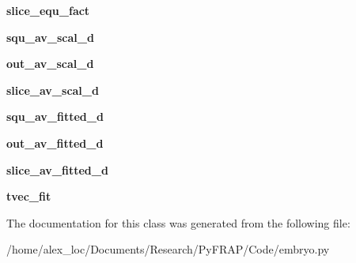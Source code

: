 \begin{DoxyCompactItemize}
\item 
\hypertarget{classembryo_1_1fit_a37bb6ea29d982d8238b3c079fff11ba7}{{\bfseries slice\+\_\+equ\+\_\+fact}}\label{classembryo_1_1fit_a37bb6ea29d982d8238b3c079fff11ba7}

\item 
\hypertarget{classembryo_1_1fit_a14d10ad90d5fa0be505dc6ad014aa457}{{\bfseries squ\+\_\+av\+\_\+scal\+\_\+d}}\label{classembryo_1_1fit_a14d10ad90d5fa0be505dc6ad014aa457}

\item 
\hypertarget{classembryo_1_1fit_aabd69eae141a7d325bd76324ddce732f}{{\bfseries out\+\_\+av\+\_\+scal\+\_\+d}}\label{classembryo_1_1fit_aabd69eae141a7d325bd76324ddce732f}

\item 
\hypertarget{classembryo_1_1fit_adea19a558ac1a2cf222bfbc5386c9556}{{\bfseries slice\+\_\+av\+\_\+scal\+\_\+d}}\label{classembryo_1_1fit_adea19a558ac1a2cf222bfbc5386c9556}

\item 
\hypertarget{classembryo_1_1fit_a2288c0102f953546d859d4595712d549}{{\bfseries squ\+\_\+av\+\_\+fitted\+\_\+d}}\label{classembryo_1_1fit_a2288c0102f953546d859d4595712d549}

\item 
\hypertarget{classembryo_1_1fit_a689a6b4e36fd70bc202439d37926b028}{{\bfseries out\+\_\+av\+\_\+fitted\+\_\+d}}\label{classembryo_1_1fit_a689a6b4e36fd70bc202439d37926b028}

\item 
\hypertarget{classembryo_1_1fit_a2de644070aae306a8308071110fb0606}{{\bfseries slice\+\_\+av\+\_\+fitted\+\_\+d}}\label{classembryo_1_1fit_a2de644070aae306a8308071110fb0606}

\item 
\hypertarget{classembryo_1_1fit_ab94efbfe1f3d537e69209af79aff36c6}{{\bfseries tvec\+\_\+fit}}\label{classembryo_1_1fit_ab94efbfe1f3d537e69209af79aff36c6}

\end{DoxyCompactItemize}


The documentation for this class was generated from the following file\+:\begin{DoxyCompactItemize}
\item 
/home/alex\+\_\+loc/\+Documents/\+Research/\+Py\+F\+R\+A\+P/\+Code/embryo.\+py\end{DoxyCompactItemize}
